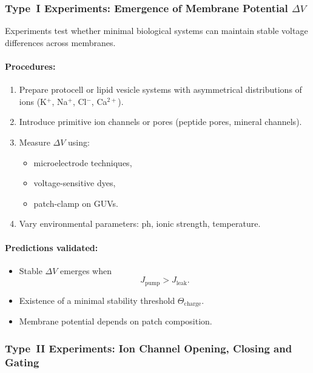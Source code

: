 \subsubsection{Type~I Experiments: Emergence of Membrane Potential \texorpdfstring{$\Delta V$}{ΔV}}

Experiments test whether minimal biological systems can maintain 
stable voltage differences across membranes.

\paragraph{Procedures:}

\begin{enumerate}
    \item Prepare protocell or lipid vesicle systems with asymmetrical 
          distributions of ions (K$^+$, Na$^+$, Cl$^-$, Ca$^{2+}$).
    \item Introduce primitive ion channels or pores (peptide pores, mineral channels).
    \item Measure $\Delta V$ using:
          \begin{itemize}
              \item microelectrode techniques,
              \item voltage-sensitive dyes,
              \item patch-clamp on GUVs.
          \end{itemize}
    \item Vary environmental parameters: ph, ionic strength, temperature.
\end{enumerate}

\paragraph{Predictions validated:}

\begin{itemize}
    \item Stable $\Delta V$ emerges when 
          \[
              J_{\mathrm{pump}} > J_{\mathrm{leak}}.
          \]
    \item Existence of a minimal stability threshold $\Theta_{\mathrm{charge}}$.
    \item Membrane potential depends on patch composition.
\end{itemize}



\subsubsection{Type~II Experiments: Ion Channel Opening, Closing and Gating}

